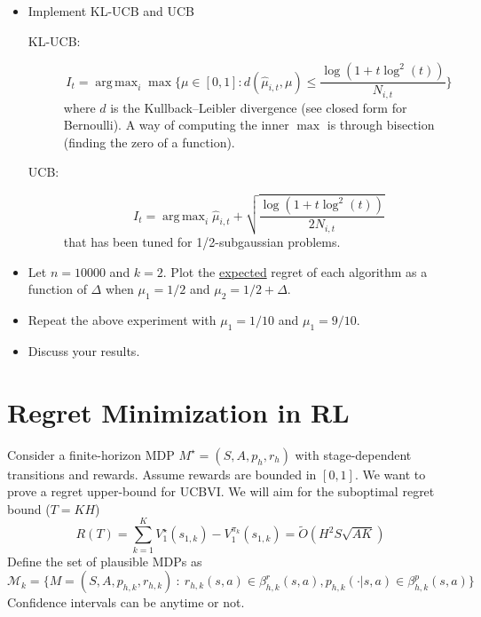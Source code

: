 \documentclass[a4paper]{article}
\newcommand{\wh}[1]{\widehat{#1}}
\newcommand{\wt}[1]{\widetilde{#1}}
\DeclareMathOperator*{\argmax}{\arg\,\max}
\begin{document}
\begin{itemize}
    \item Implement KL-UCB and UCB
    \begin{description}
        \item[KL-UCB:]
        \[
            I_t = \argmax_i \max \bigg\{ \mu \in [0,1] : d(\wh\mu_{i, t},\mu) \leq \frac{\log(1+t\log^2(t))}{N_{i,t}} \bigg\}    
        \]  
        where $d$ is the Kullback–Leibler divergence (see closed form for Bernoulli). A way of computing the inner $\max$ is through bisection (finding the zero of a function).
        \item[UCB:]
        \[
            I_t = \argmax_i \wh\mu_{i,t} + \sqrt{\frac{\log(1+t\log^2(t))}{2N_{i,t}}}    
        \]
        that has been tuned for 1/2-subgaussian problems.
    \end{description}
    \item Let $n = 10000$ and $k = 2$. Plot the \underline{expected} regret of each algorithm as a function of $\Delta$ when $\mu_1 = 1/2$ and $\mu_2 = 1/2 + \Delta$. 
    \item Repeat the above experiment with $\mu_1 = 1/10$ and $\mu_1 = 9/10$.
    \item Discuss your results.
\end{itemize}

\section{Regret Minimization in RL}
Consider a finite-horizon MDP $M^\star = (S, A, p_h, r_h)$ with stage-dependent transitions and rewards. Assume rewards are bounded in $[0,1]$.
We want to prove a regret upper-bound for UCBVI. We will aim for the suboptimal regret bound ($T=KH$)
\[
    R(T) = \sum_{k=1}^K V^\star_1(s_{1,k}) - V^{\pi_k}_1(s_{1,k}) = \wt{O}(H^2S\sqrt{AK})
\]
Define the set of plausible MDPs as 
\[
    \mathcal{M}_k = \{ M = (S,A, p_{h,k}, r_{h,k}) ~:~ r_{h,k}(s,a) \in \beta^r_{h,k}(s,a), p_{h,k}(\cdot|s,a) \in \beta^p_{h,k}(s,a)  \}
\]
Confidence intervals can be anytime or not.
\end{document}
